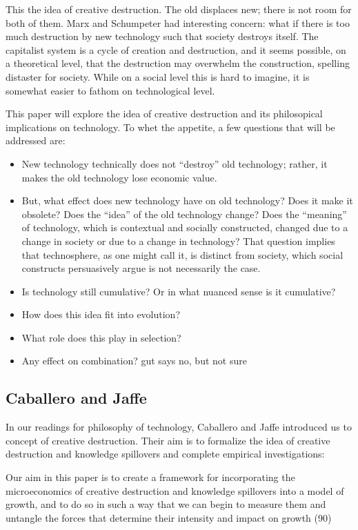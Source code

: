 \documentclass[11pt]{article}
\begin{document}
This the idea of creative destruction.
The old displaces new; there is not room for both of them.
Marx and Schumpeter had interesting concern: what if there is too much destruction by new technology such that society destroys itself.
The capitalist system is a cycle of creation and destruction, and it seems possible, on a theoretical level, that the destruction may overwhelm the construction, spelling distaster for society.
While on a social level this is hard to imagine, it is somewhat easier to fathom on technological level.

This paper will explore the idea of creative destruction and its philosopical implications on technology. 
To whet the appetite, a few questions that will be addressed are:
\begin{itemize}
    \item New technology technically does not ``destroy'' old technology; rather, it makes the old technology lose economic value.
    \item But, what effect does new technology have on old technology? Does it make it obsolete? Does the ``idea'' of the old technology change? Does the ``meaning'' of technology, which is contextual and socially constructed, changed due to a change in society or due to a change in technology? That question implies that technosphere, as one might call it, is distinct from society, which social constructs persuasively argue is not necessarily the case.
    \item Is technology still cumulative? Or in what nuanced sense is it cumulative?
    \item How does this idea fit into evolution?
    \item What role does this play in selection?
    \item Any effect on combination? gut says no, but not sure
\end{itemize}

\subsection{Caballero and Jaffe}
In our readings for philosophy of technology, Caballero and Jaffe introduced us to concept of creative destruction.
Their aim is to formalize the idea of creative destruction and knowledge spillovers and complete empirical investigations:
\begin{displayquote}
    Our aim in this paper is to create a framework for incorporating the microeconomics of creative destruction and knowledge spillovers into a model of growth, and to do so in such a way that we can begin to measure them and untangle the forces that determine their intensity and impact on growth (90)
\end{displayquote}
\end{document}
